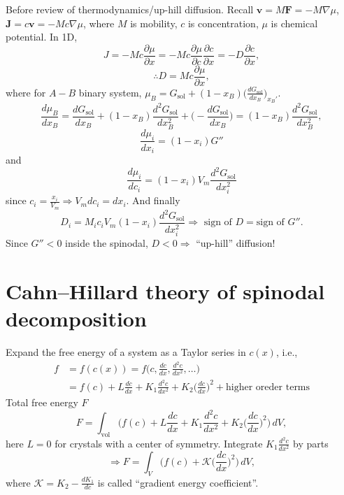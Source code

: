 \documentclass[12pt]{article}
\begin{document}
Before review of thermodynamics/up-hill diffusion.
Recall $\bm{v} = M \bm{F} = - M \nabla \mu$, $\bm{J} = c \bm{v} = - M c \nabla \mu$, where
$M$ is mobility, $c$ is concentration, $\mu$ is chemical potential.
In 1D,
\begin{equation*}
	J = - M c \frac{ \partial \mu }{ \partial x } = - M c \frac{ \partial \mu }{ \partial c } \frac{ \partial c }{ \partial x } = - D \frac{ \partial c }{ \partial x },
\end{equation*}
\begin{equation*}
	\therefore D = M c \frac{ \partial \mu }{ \partial x },
\end{equation*}
where for $A-B$ binary system, $\mu_B = G_{\text{sol}} + (1-x_B)
	\Big( \frac{ dG_{\text{sol}} }{ dx_B } \Big)_{x_B'}$.
\begin{equation*}
	\frac{ d\mu_B }{ dx_B } = \frac{ dG_{\text{sol}} }{ dx_B } + (1-x_B)
	\frac{ d^2G_{\text{sol}} }{ dx_B^2 } +
	\Big( - \frac{ dG_{\text{sol}} }{ dx_B } \Big) =
	(1-x_B)
	\frac{ d^2G_{\text{sol}} }{ dx_B^2 },
\end{equation*}
\begin{equation*}
	\frac{ d\mu_i }{ dx_i } = (1-x_i) G''
\end{equation*}
and
\begin{equation*}
	\frac{ d\mu_i }{ dc_i } = (1-x_i) V_m \frac{ d^2G_{\text{sol}} }{ dx_i^2 }
\end{equation*}
since $c_i = \frac{ x_i }{ V_m } \Rightarrow V_m dc_i = dx_i$.
And finally
\begin{equation*}
	D_i = M_i c_i V_m (1-x_i) \frac{ d^2G_{\text{sol}} }{ dx_i^2 } \Rightarrow
	{\text{ sign of }} D = {\text{sign of }} G''.
\end{equation*}
Since $G'' < 0$ inside the spinodal, $D < 0 \Rightarrow $ ``up-hill'' diffusion!

\section{Cahn--Hillard theory of spinodal decomposition}
Expand the free energy of a system as a Taylor series in $c(x)$,
i.e.,
\begin{align*}
	f & = f(c(x)) = f\Big( c, \frac{ dc }{ dx }, \frac{ d^2 c }{ dx^2 }, \ldots \Big) \\
	  & = f(c) + L \frac{ dc }{ dx } + K_1 \frac{ d^2 c }{ dx^2 } + K_2 \Big(
	\frac{ dc }{ dx } \Big)^2 + {\text{higher oreder terms}}
\end{align*}
Total free energy $F$
\begin{equation*}
	F = \int_{\text{vol}} \bigg(
	f(c) + L \frac{ dc }{ dx } + K_1 \frac{ d^2 c }{ dx^2 } + K_2 \Big(
	\frac{ dc }{ dx } \Big)^2 \bigg) \, dV,
\end{equation*}
here $L = 0$ for crystals with a center of symmetry.
Integrate $K_1 \frac{ d^2 c }{ dx^2 }$ by parts
\begin{equation*}
	\Rightarrow F = \int_V \bigg(
	f(c) + \mathcal{K} \Big( \frac{ dc }{ dx } \Big)^2
	\bigg) \, dV,
\end{equation*}
where $\mathcal{K} = K_2 - \frac{ dK_1 }{ dc }$ is called ``gradient energy
coefficient''.
\end{document}
